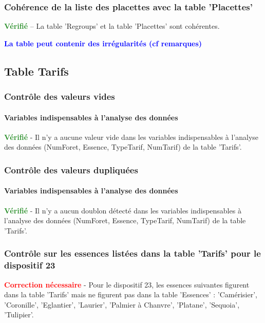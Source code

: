 \documentclass[a4paper]{article}
\begin{document}
      \subsubsection{Cohérence de la liste des placettes avec la table 'Placettes'}\textcolor{ForestGreen}{\textbf{Vérifié}} -- La table 'Regroups' et la table 'Placettes' sont cohérentes.\FloatBarrier \begin{center}
                    \textcolor{blue}{\textbf{La table peut contenir des irrégularités (cf remarques)}}
                    \end{center}
                    
\FloatBarrier

\subsection{Table Tarifs}
\subsubsection{Contrôle des valeurs vides}
\paragraph{Variables indispensables à l'analyse des données}
\textcolor{ForestGreen}{\textbf{Vérifié}} - Il n'y a aucune valeur vide dans les variables indispensables à l'analyse des données (NumForet, Essence, TypeTarif, NumTarif) de la table 'Tarifs'. \\ 

\subsubsection{Contrôle des valeurs dupliquées}
\paragraph{Variables indispensables à l'analyse des données}
\textcolor{ForestGreen}{\textbf{Vérifié}} - Il n'y a aucun doublon détecté dans les variables indispensables à l'analyse des données (NumForet, Essence, TypeTarif, NumTarif) de la table 'Tarifs'. \\ 

\subsubsection{Contrôle sur les essences listées dans la table 'Tarifs' pour le dispositif 23}
\textcolor{red}{\textbf{Correction nécessaire}} - Pour le dispositif 23, les essences suivantes figurent dans la table 'Tarifs' mais ne figurent pas dans la table 'Essences' : 'Camérisier', 'Coronille', 'Eglantier', 'Laurier', 'Palmier à Chanvre', 'Platane', 'Sequoia', 'Tulipier'.\\
\end{document}
